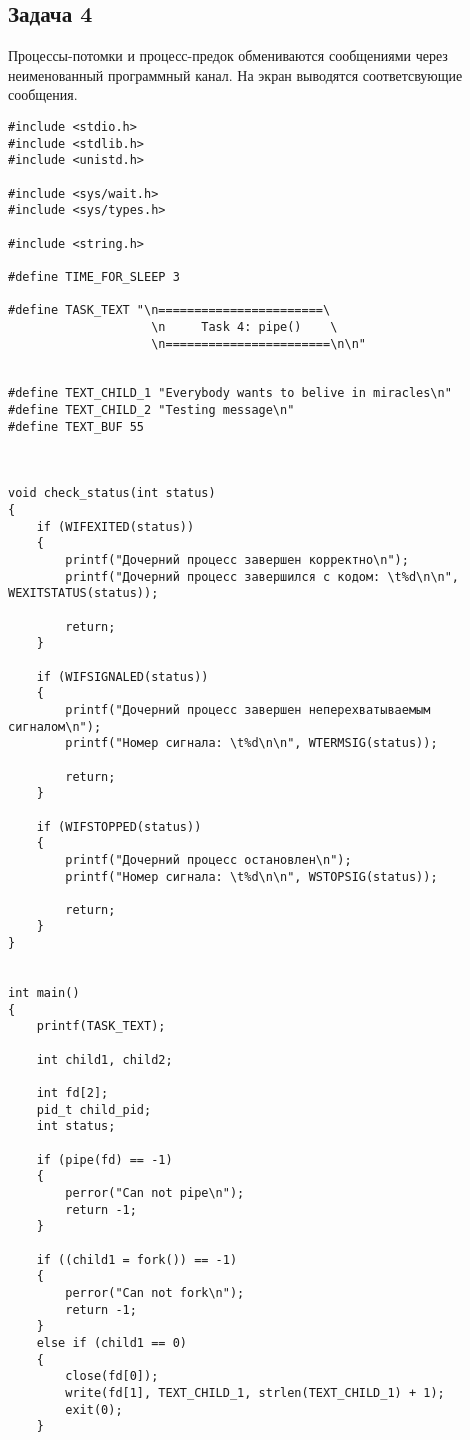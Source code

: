 
\clearpage


\subsection*{Задача 4} 
Процессы-потомки и процесс-предок обмениваются сообщениями через неименованный программный канал. 
На экран выводятся соответсвующие сообщения.

\begin{lstlisting}[style={asm},label=lst:pipe,caption=Использование pipe()]
#include <stdio.h>
#include <stdlib.h>
#include <unistd.h>

#include <sys/wait.h>
#include <sys/types.h>

#include <string.h>

#define TIME_FOR_SLEEP 3

#define TASK_TEXT "\n=======================\
                    \n     Task 4: pipe()    \
                    \n=======================\n\n"


#define TEXT_CHILD_1 "Everybody wants to belive in miracles\n"
#define TEXT_CHILD_2 "Testing message\n"
#define TEXT_BUF 55



void check_status(int status)
{
    if (WIFEXITED(status))
    {
        printf("Дочерний процесс завершен корректно\n");
        printf("Дочерний процесс завершился с кодом: \t%d\n\n", WEXITSTATUS(status));

        return;
    }

    if (WIFSIGNALED(status))
    {
        printf("Дочерний процесс завершен неперехватываемым сигналом\n");
        printf("Номер сигнала: \t%d\n\n", WTERMSIG(status));

        return;
    }

    if (WIFSTOPPED(status))
    {
        printf("Дочерний процесс остановлен\n");
        printf("Номер сигнала: \t%d\n\n", WSTOPSIG(status));

        return;
    }
}


int main()
{
    printf(TASK_TEXT);

    int child1, child2;

    int fd[2];
    pid_t child_pid;
    int status;

    if (pipe(fd) == -1)
    {
        perror("Can not pipe\n");
        return -1;
    }

    if ((child1 = fork()) == -1)
    {
        perror("Can not fork\n");
        return -1;
    }
    else if (child1 == 0)
    {
        close(fd[0]);
        write(fd[1], TEXT_CHILD_1, strlen(TEXT_CHILD_1) + 1);
        exit(0);
    }


\end{lstlisting}
